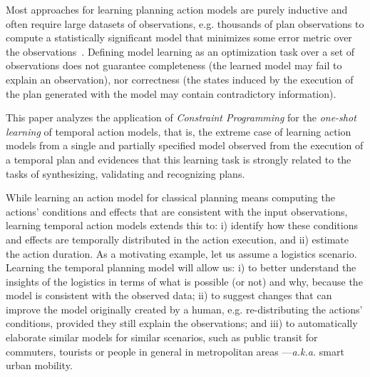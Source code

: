 \documentclass{ecai}
\begin{document}
Most approaches for learning planning action models are purely inductive and often require large datasets of observations, e.g. thousands of plan observations to compute a statistically significant model that minimizes some error metric over the observations~\cite{yang2007learning,MouraoZPS12,zhuo2013action,kuvcera2018louga}. Defining model learning as an optimization task over a set of observations does not guarantee completeness (the learned model may fail to explain an observation), nor correctness (the states induced by the execution of the plan generated with the model may contain contradictory information).

This paper analyzes the application of {\em Constraint Programming} for the {\em one-shot learning} of temporal action models, that is, the extreme case of learning action models from a single and partially specified model observed from the execution of a temporal plan and evidences that this learning task is strongly related to the tasks of synthesizing, validating and recognizing plans.

While learning an action model for classical planning means computing the actions' conditions and effects that are consistent with the input observations, learning temporal action models extends this to: i) identify how these conditions and effects are temporally distributed in the action execution, and ii) estimate the action duration. As a motivating example, let us assume a logistics scenario. Learning the temporal planning model will allow us: i) to better understand the insights of the logistics in terms of what is possible (or not) and why, because the model is consistent with the observed data; ii) to suggest changes that can improve the model originally created by a human, e.g. re-distributing the actions' conditions, provided they still explain the observations; and iii) to automatically elaborate
similar models for similar scenarios, such as public transit for commuters, tourists or people in general in metropolitan areas ---\emph{a.k.a.} smart urban mobility.
\end{document}
